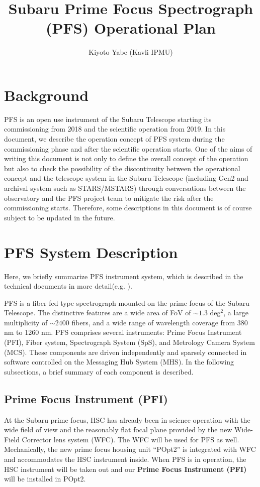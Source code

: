 \documentclass[a4paper]{article}
\title{Subaru Prime Focus Spectrograph (PFS) Operational Plan}
\author{Kiyoto Yabe (Kavli IPMU)}
\begin{document}
\maketitle
\tableofcontents

\clearpage
\section{Background}
PFS is an open use instrument of the Subaru Telescope starting its
commissioning from 2018 and the scientific operation from 2019. In
this document, we describe the operation concept of PFS system during
the commissioning phase and after the scientific operation starts. One
of the aims of writing this document is not only to define the overall
concept of the operation but also to check the possibility of the
discontinuity between the operational concept and the telescope system
in the Subaru Telescope (including Gen2 and archival system such as
STARS/MSTARS) through conversations between the observatory and the
PFS project team to mitigate the risk after the commissioning
starts. Therefore, some descriptions in this document is of course
subject to be updated in the future.

\section{PFS System Description\label{sec:pfs_system}}
Here, we briefly summarize PFS instrument system, which is described
in the technical documents in more detail(e.g. \cite{tamura16}).

PFS is a fiber-fed type spectrograph mounted on the prime focus of the
Subaru Telescope. The distinctive features are a wide area of FoV of
$\sim1.3$ deg$^{2}$, a large multiplicity of $\sim2400$ fibers, and a
wide range of wavelength coverage from 380 nm to 1260 nm. PFS
comprises several instruments: Prime Focus Instrument (PFI), Fiber
system, Spectrograph System (SpS), and Metrology Camera System
(MCS). These components are driven independently and sparsely
connected in software controlled on the Messaging Hub System (MHS). In
the following subsections, a brief summary of each component is
described.

\subsection{Prime Focus Instrument (PFI)\label{sec:pfs_system:pfi}}
At the Subaru prime focus, HSC has already been in science operation
with the wide field of view and the reasonably flat focal plane
provided by the new Wide-Field Corrector lens system (WFC). The WFC
will be used for PFS as well. Mechanically, the new prime focus
housing unit ``POpt2'' is integrated with WFC and accommodates the HSC
instrument inside. When PFS is in operation, the HSC instrument will
be taken out and our {\bf Prime Focus Instrument (PFI)} will be
installed in POpt2.
\end{document}
